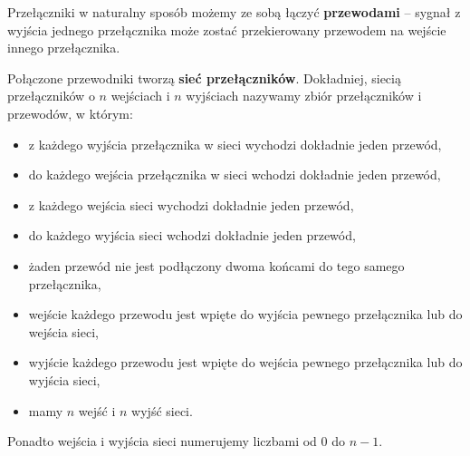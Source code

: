 \documentclass[a4paper]{article}
\theoremstyle{definition}
\begin{document}
\vspace{1em}

Przełączniki w naturalny sposób możemy ze sobą łączyć {\bf przewodami} -- sygnał z wyjścia jednego przełącznika może zostać przekierowany przewodem na wejście innego przełącznika. 

\vspace{1em}

Połączone przewodniki tworzą {\bf sieć przełączników}. Dokładniej, siecią przełączników o \(n\) wejściach i \(n\) wyjściach nazywamy zbiór przełączników i przewodów, w którym:

\begin{itemize}
    \item z każdego wyjścia przełącznika w sieci wychodzi dokładnie jeden przewód,
    \item do każdego wejścia przełącznika w sieci wchodzi dokładnie jeden przewód,
    \item z każdego wejścia sieci wychodzi dokładnie jeden przewód,
    \item  do każdego wyjścia sieci wchodzi dokładnie jeden przewód, 
    \item żaden przewód nie jest podłączony dwoma końcami do tego samego przełącznika,
    \item wejście każdego przewodu jest wpięte do wyjścia pewnego przełącznika lub do wejścia sieci,
    \item wyjście każdego przewodu jest wpięte do wejścia pewnego przełącznika lub do wyjścia sieci,
    \item mamy \(n\) wejść i \(n\) wyjść sieci.
\end{itemize}

Ponadto wejścia i wyjścia sieci numerujemy liczbami od \(0\) do \(n-1\).
\end{document}
